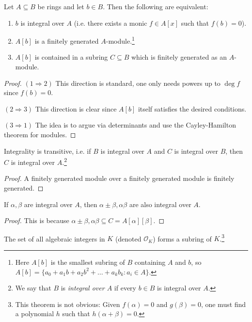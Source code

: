 \begin{theorem}
  Let $A \subseteq B$ be rings and let $b \in B$.
  Then the following are equivalent:
  \begin{enumerate}
    \item $b$ is integral over $A$ (i.e. there exists
      a monic $f \in A[x]$ such that $f(b) = 0$).
    \item $A[b]$ is a finitely generated $A$-module.\footnote{Here $A[b]$ is the smallest subring of $B$ containing $A$ and $b$, so $A[b] = \{a_0 + a_1 b + a_2 b^2 + \dots + a_k b_k : a_i \in A\}$.}
    \item $A[b]$ is contained in a subring $C \subseteq B$
      which is finitely generated as an $A$-module.
  \end{enumerate}
\end{theorem}

\begin{proof}
  $(1 \Rightarrow 2)$ This direction is standard, one
  only needs powers up to $\deg f$ since $f(b) = 0$.

  $(2 \Rightarrow 3)$ This direction is clear
  since $A[b]$ itself satisfies the desired conditions.

  $(3 \Rightarrow 1)$ The idea is to argue via
  determinants and use the Cayley-Hamilton theorem for
  modules.
\end{proof}

\begin{corollary}
  Integrality is transitive, i.e. if $B$ is integral
  over $A$ and $C$ is integral over $B$, then $C$ is
  integral over $A$.\footnote{We say that $B$ is \emph{integral over $A$} if every $b \in B$ is integral over $A$.}
\end{corollary}

\begin{proof}
  A finitely generated module over a finitely
  generated module is finitely generated.
\end{proof}

\begin{corollary}
  If $\alpha, \beta$ are integral over $A$, then
  $\alpha \pm \beta, \alpha \beta$ are also integral
  over $A$.
\end{corollary}

\begin{proof}
  This is because
  $\alpha \pm \beta, \alpha \beta \subseteq C = A[\alpha][\beta]$.
\end{proof}

\begin{theorem}
  The set of all algebraic integers in $K$ (denoted
  $\mathcal{O}_K$) forms a
  subring of $K$.\footnote{This theorem is not obvious: Given $f(\alpha) = 0$ and
  $g(\beta) = 0$, one must find a polynomial $h$ such
  that $h(\alpha + \beta) = 0$.}
\end{theorem}
